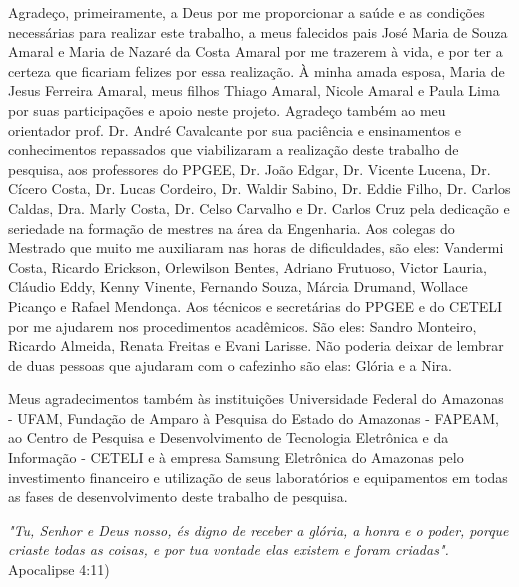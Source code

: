 \documentclass[
12pt,				%
openright,			%
oneside,			%
a4paper,			%
english,			%
brazil				%
]{abntex2}
\begin{document}
\begin{agradecimentos}
	Agradeço, primeiramente, a Deus por me proporcionar a saúde e as condições necessárias para realizar este trabalho, a meus falecidos pais José Maria de Souza Amaral e Maria de Nazaré da Costa Amaral por me trazerem à vida, e por ter a certeza que ficariam felizes por essa realização.  À minha amada esposa, Maria de Jesus Ferreira Amaral, meus filhos Thiago Amaral, Nicole Amaral e Paula Lima por suas participações e apoio neste projeto. Agradeço também ao meu orientador prof. Dr. André Cavalcante por sua paciência e ensinamentos e conhecimentos repassados que viabilizaram a realização deste trabalho de pesquisa, aos professores do PPGEE, Dr. João Edgar, Dr. Vicente Lucena, Dr. Cícero Costa, Dr. Lucas Cordeiro, Dr. Waldir Sabino, Dr. Eddie Filho, Dr. Carlos Caldas, Dra. Marly Costa, Dr. Celso Carvalho e Dr. Carlos Cruz pela dedicação e seriedade na formação de mestres na área da Engenharia. Aos colegas do Mestrado que muito me auxiliaram nas horas de dificuldades, são eles: Vandermi Costa, Ricardo Erickson, Orlewilson Bentes, Adriano Frutuoso, Victor Lauria, Cláudio Eddy, Kenny Vinente, Fernando Souza, Márcia Drumand, Wollace Picanço e Rafael Mendonça. Aos técnicos e secretárias do PPGEE e do CETELI por me ajudarem nos procedimentos acadêmicos. São eles: Sandro Monteiro, Ricardo Almeida, Renata Freitas e Evani Larisse. Não poderia deixar de lembrar de duas pessoas que ajudaram com o cafezinho são elas: Glória e a Nira.\par
	Meus agradecimentos também às instituições Universidade Federal do Amazonas - UFAM, Fundação de Amparo à Pesquisa do Estado do Amazonas - FAPEAM, ao Centro de Pesquisa e Desenvolvimento de Tecnologia Eletrônica e da Informação  - CETELI e à empresa Samsung Eletrônica do Amazonas pelo investimento financeiro e utilização de seus laboratórios e equipamentos em todas as fases de desenvolvimento deste trabalho de pesquisa. 
\end{agradecimentos}

\begin{epigrafe}
	\vspace*{\fill}
	\begin{flushright}
		\textit{"Tu, Senhor e Deus nosso, és digno de receber a glória, a honra e o poder, porque criaste todas as coisas, e por tua vontade elas existem e foram criadas".} {Apocalipse 4:11)}
	\end{flushright}
\end{epigrafe}
\end{document}
